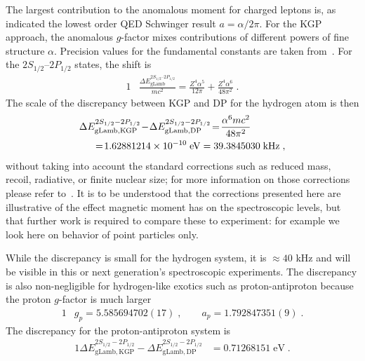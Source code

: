 The largest contribution to the anomalous moment for charged leptons is, as indicated the lowest order QED Schwinger result $a=\alpha/2\pi$. For the KGP approach, the anomalous $g$-factor mixes contributions of different powers of fine structure $\alpha$. Precision values for the fundamental constants are taken from~\cite{Tiesinga:2021myr}. For the $2S_{1/2}–2P_{1/2}$ states, the shift is
\begin{alignat}{1}
\label{lamb04} &\frac{\Delta E_{\mathrm{gLamb}}^{2S_{1/2}–2P_{1/2}}}{mc^{2}}=\frac{Z^{4}\alpha^{5}}{12\pi}+\frac{Z^{4}\alpha^{6}}{48\pi^{2}}\;.
\end{alignat}
The scale of the discrepancy between KGP and DP for the hydrogen atom is then
\begin{alignat}{1}
\label{lamb05} \Delta &E_{\mathrm{gLamb,KGP}}^{2S_{1/2}-2P_{1/2}}\!-\!\Delta E_{\mathrm{gLamb,DP}}^{2S_{1/2}-2P_{1/2}}\!=\!\frac{\alpha^{6}mc^{2}}{48\pi^{2}}\\ \notag&\;\;=\!1.62881214\times10^{-10}\;\mathrm{eV} =39.3845030\;\mathrm{kHz}\;,\end{alignat}
without taking into account the standard corrections such as reduced mass, recoil, radiative, or finite nuclear size; for more information on those corrections please refer to~\cite{Tiesinga:2021myr,Jentschura:1996zz,Eides:2000xc}. It is to be understood that the corrections presented here are illustrative of the effect magnetic moment has on the spectroscopic levels, but that further work is required to compare these to experiment: for example we look here on behavior of point particles only.

While the discrepancy is small for the hydrogen system, it is $\approx 40$ kHz and will be visible in this or next generation\rq s spectroscopic experiments. The discrepancy is also non-negligible for hydrogen-like exotics such as proton-antiproton because the proton $g$-factor is much larger
\begin{alignat}{1}\label{gpaFULL}
&g_p=5.585694702(17)\;,\qquad a_p=1.792847351(9)\;. 
\end{alignat} 
The discrepancy for the proton-antiproton system is
\begin{alignat}{1}
\label{lamb06} \Delta E_{\mathrm{gLamb,KGP}}^{2S_{1/2}-2P_{1/2}}-\Delta E_{\mathrm{gLamb,DP}}^{2S_{1/2}-2P_{1/2}}&=0.71268151\;\mathrm{eV}\;.
\end{alignat} 


